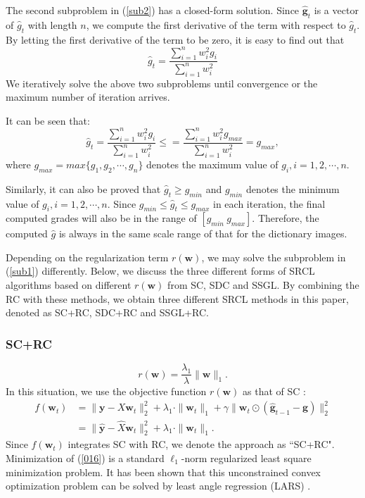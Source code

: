 \documentclass[journal]{IEEEtran}
\begin{document}
  The second subproblem in (\ref{sub2}) has a closed-form solution. Since $\hat{\textbf{g}}_t$ is a vector of $\hat{g}_t$ with length $n$, we compute the first derivative of the term with respect to   $\hat{g}_{t}$.
  By letting the first derivative of the term to be zero, it is easy to find out  that
  \begin{equation}
   \hat{g}_{t}=\frac{\sum_{i=1}^n w_i^2g_i}{\sum_{i=1}^n w_i^2}
  \end{equation}
  We iteratively solve the above two subproblems until convergence or the maximum number of iteration arrives.

  It can be seen that:
  \begin{equation}
   \hat{g}_{t}=\frac{\sum_{i=1}^n w_i^2g_i}{\sum_{i=1}^n w_i^2}\leq=\frac{\sum_{i=1}^n w_i^2g_{max}}{\sum_{i=1}^n w_i^2}=g_{max},
  \end{equation}
  where $g_{max}=max\{g_1, g_2, \cdots, g_n \}$ denotes the maximum value of $g_i, i=1, 2, \cdots, n$.

  Similarly, it can also be proved that $\hat{g}_t \geq g_{min}$ and $g_{min}$ denotes the minimum value of $g_i, i=1, 2, \cdots, n$. Since $g_{min}\leq \hat{g}_t \leq g_{max}$ in each iteration, the final computed grades will also
  be in the range of $[g_{min}~g_{max}]$. Therefore, the computed $\hat{g}$ is always in the same scale range of that for the dictionary images.

  Depending on the regularization term $r(\textbf{w})$, we may solve the subproblem in (\ref{sub1}) differently.
  Below, we discuss the three different forms of SRCL algorithms based on different $r(\textbf{w})$ from SC, SDC and SSGL. By combining the RC with these  methods, we obtain three different SRCL methods in this paper, denoted as SC+RC, SDC+RC and SSGL+RC.


 \subsubsection{SC+RC}


  \begin{equation}
 r(\textbf{w})=\frac{\lambda_1}{\lambda}\|\textbf{w}\|_1.
 \end{equation}
 In this situation, we use the objective function $r(\textbf{w})$ as that of SC \cite{sparsecoding}:
 \begin{align}
  f(\textbf{w}_t)&= \|\textbf{y}-X\textbf{w}_t\|^2_2+  \lambda_1 \cdot \|\textbf{w}_t\|_1 +\gamma    \|\textbf{w}_t\odot (\hat{\textbf{g}}_{t-1} -\textbf{g})  \|_2^2\nonumber \\
  &=\|\hat{\textbf{y}}-\hat{X}\textbf{w}_t\|^2_2+\lambda_1\cdot \|\textbf{w}_t\|_1. \label{016}
  \end{align}
 Since $f(\textbf{w}_t)$ integrates SC with RC, we denote the  approach as ``SC+RC".
 Minimization of (\ref{016}) is a standard $\ell_1$-norm regularized least square minimization problem.
It has been shown that this
unconstrained convex optimization problem can be solved by least
angle regression (LARS) \cite{lars2004}.
\end{document}
